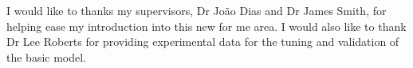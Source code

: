 
\begin{acknowledgements}      


I would like to thanks my supervisors, Dr João Dias and Dr James
Smith, for helping ease my introduction into this new for me area. I would
also like to thank Dr Lee Roberts for providing experimental data for the
tuning and validation of the basic model.
\end{acknowledgements}
